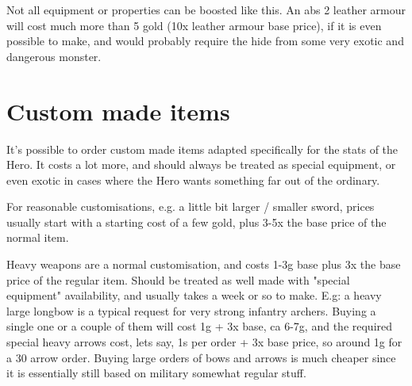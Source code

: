 
Not all equipment or properties can be boosted like this. An abs 2 leather armour will cost much more than 5 gold (10x leather armour base price), if it is even possible to make, and would probably require the hide from some very exotic and dangerous monster.


\section*{Custom made items}
It's possible to order custom made items adapted specifically for the stats of the Hero. It costs a lot more, and should always be treated as special equipment, or even exotic in cases where the Hero wants something far out of the ordinary.

For reasonable customisations, e.g. a little bit larger / smaller sword, prices usually start with a starting cost of a few gold, plus 3-5x the base price of the normal item.

Heavy weapons are a normal customisation, and costs 1-3g base plus 3x the base price of the regular item. Should be treated as well made with "special equipment" availability, and usually takes a week or so to make.
E.g: a heavy large longbow is a typical request for very strong infantry archers. Buying a single one or a couple of them will cost 1g + 3x base, ca 6-7g, and the required special heavy arrows cost, lets say, 1s per order + 3x base price, so around 1g for a 30 arrow order. Buying large orders of bows and arrows is much cheaper since it is essentially still based on military somewhat regular stuff.









